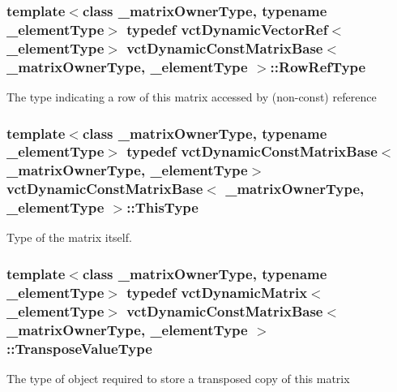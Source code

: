 \subsubsection[{Row\+Ref\+Type}]{\setlength{\rightskip}{0pt plus 5cm}template$<$class \+\_\+matrix\+Owner\+Type, typename \+\_\+element\+Type$>$ typedef {\bf vct\+Dynamic\+Vector\+Ref}$<$\+\_\+element\+Type$>$ {\bf vct\+Dynamic\+Const\+Matrix\+Base}$<$ \+\_\+matrix\+Owner\+Type, \+\_\+element\+Type $>$\+::{\bf Row\+Ref\+Type}}\label{classvct_dynamic_const_matrix_base_a15b845e745a76559d730ecef10a991b7}
The type indicating a row of this matrix accessed by (non-\/const) reference \hypertarget{classvct_dynamic_const_matrix_base_ac4ff48cbe4d9de3fdef5a02447ffb9db}{}
\subsubsection[{This\+Type}]{\setlength{\rightskip}{0pt plus 5cm}template$<$class \+\_\+matrix\+Owner\+Type, typename \+\_\+element\+Type$>$ typedef {\bf vct\+Dynamic\+Const\+Matrix\+Base}$<$\+\_\+matrix\+Owner\+Type, \+\_\+element\+Type$>$ {\bf vct\+Dynamic\+Const\+Matrix\+Base}$<$ \+\_\+matrix\+Owner\+Type, \+\_\+element\+Type $>$\+::{\bf This\+Type}}\label{classvct_dynamic_const_matrix_base_ac4ff48cbe4d9de3fdef5a02447ffb9db}
Type of the matrix itself. \hypertarget{classvct_dynamic_const_matrix_base_aae6fde8d869581c6de1f1cbe7f17c588}{}
\subsubsection[{Transpose\+Value\+Type}]{\setlength{\rightskip}{0pt plus 5cm}template$<$class \+\_\+matrix\+Owner\+Type, typename \+\_\+element\+Type$>$ typedef {\bf vct\+Dynamic\+Matrix}$<$\+\_\+element\+Type$>$ {\bf vct\+Dynamic\+Const\+Matrix\+Base}$<$ \+\_\+matrix\+Owner\+Type, \+\_\+element\+Type $>$\+::{\bf Transpose\+Value\+Type}}\label{classvct_dynamic_const_matrix_base_aae6fde8d869581c6de1f1cbe7f17c588}
The type of object required to store a transposed copy of this matrix \hypertarget{classvct_dynamic_const_matrix_base_a42f1e63cd9923069111d907ec98ac6ee}{}
